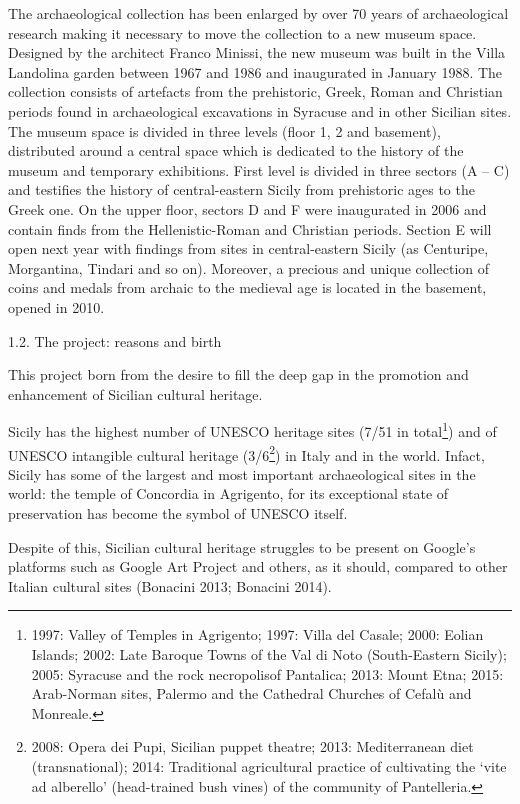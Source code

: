 \documentclass[amsthm,ebook]{saparticle}
\begin{document}
The archaeological collection has been enlarged by over 70 years of archaeological research making it necessary to move
the collection to a new museum space. Designed by the architect Franco Minissi, the new museum was built in the Villa
Landolina garden between 1967 and 1986 and inaugurated in January 1988. The collection consists of artefacts from the
prehistoric, Greek, Roman and Christian periods found in archaeological excavations in Syracuse and in other Sicilian
sites. The museum space is divided in three levels (floor 1, 2 and basement), distributed around a central space which
is dedicated to the history of the museum and temporary exhibitions. First level is divided in three sectors (A – C)
and testifies the history of central-eastern Sicily from prehistoric ages to the Greek one. On the upper floor, sectors
D and F were inaugurated in 2006 and contain finds from the Hellenistic-Roman and Christian periods. Section E will
open next year with findings from sites in central-eastern Sicily (as Centuripe, Morgantina, Tindari and so on).
Moreover, a precious and unique collection of coins and medals from archaic to the medieval age is located in the
basement, opened in 2010.


\bigskip

1.2. The project: reasons and birth

This project born from the desire to fill the deep gap in the promotion and enhancement of Sicilian cultural heritage. 

Sicily has the highest number of UNESCO heritage sites (7/51 in total\footnote{1997: Valley of Temples in Agrigento;
1997: Villa del Casale; 2000: Eolian Islands; 2002: Late Baroque Towns of the Val di Noto (South-Eastern Sicily); 2005:
Syracuse and the rock necropolisof Pantalica; 2013: Mount Etna; 2015: Arab-Norman sites, Palermo and the Cathedral
Churches of Cefalù and Monreale.}) and of UNESCO intangible cultural heritage (3/6\footnote{2008: Opera dei Pupi,
Sicilian puppet theatre; 2013: Mediterranean diet (transnational); 2014: Traditional agricultural practice of
cultivating the ‘vite ad alberello’ (head-trained bush vines) of the community of Pantelleria.}) in Italy and in the
world. Infact, Sicily has some of the largest and most important archaeological sites in the world: the temple of
Concordia in Agrigento, for its exceptional state of preservation has become the symbol of UNESCO itself.

Despite of this, Sicilian cultural heritage struggles to be present on Google’s platforms such as Google Art Project and
others, as it should, compared to other Italian cultural sites (Bonacini 2013; Bonacini 2014).
\end{document}
